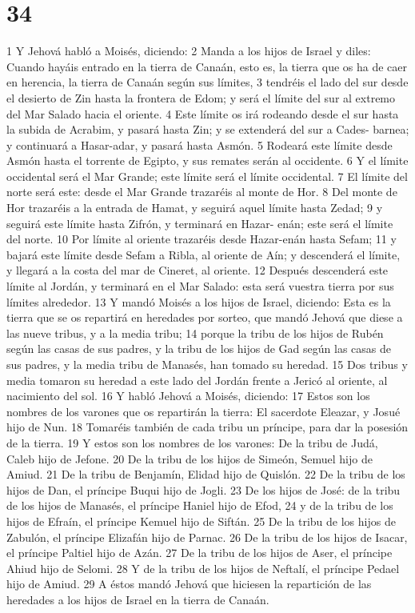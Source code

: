 \chapter{34}


1 Y Jehová habló a Moisés, diciendo:
2 Manda a los hijos de Israel y diles: Cuando hayáis entrado en la tierra de Canaán, esto es, la tierra que os ha de caer en herencia, la tierra de Canaán según sus límites,
3 tendréis el lado del sur desde el desierto de Zin hasta la frontera de Edom; y será el límite del sur al extremo del Mar Salado hacia el oriente.
4 Este límite os irá rodeando desde el sur hasta la subida de Acrabim, y pasará hasta Zin; y se extenderá del sur a Cades- barnea; y continuará a Hasar-adar, y pasará hasta Asmón.
5 Rodeará este límite desde Asmón hasta el torrente de Egipto, y sus remates serán al occidente.
6 Y el límite occidental será el Mar Grande; este límite será el límite occidental. 
7 El límite del norte será este: desde el Mar Grande trazaréis al monte de Hor.
8 Del monte de Hor trazaréis a la entrada de Hamat, y seguirá aquel límite hasta Zedad;
9 y seguirá este límite hasta Zifrón, y terminará en Hazar- enán; este será el límite del norte. 
10 Por límite al oriente trazaréis desde Hazar-enán hasta Sefam;
11 y bajará este límite desde Sefam a Ribla, al oriente de Aín; y descenderá el límite, y llegará a la costa del mar de Cineret, al oriente.
12 Después descenderá este límite al Jordán, y terminará en el Mar Salado: esta será vuestra tierra por sus límites alrededor.
13 Y mandó Moisés a los hijos de Israel, diciendo: Esta es la tierra que se os repartirá en heredades por sorteo, que mandó Jehová que diese a las nueve tribus, y a la media tribu;
14 porque la tribu de los hijos de Rubén según las casas de sus padres, y la tribu de los hijos de Gad según las casas de sus padres, y la media tribu de Manasés, han tomado su heredad.
15 Dos tribus y media tomaron su heredad a este lado del Jordán frente a Jericó al oriente, al nacimiento del sol.
16 Y habló Jehová a Moisés, diciendo:
17 Estos son los nombres de los varones que os repartirán la tierra: El sacerdote Eleazar, y Josué hijo de Nun.
18 Tomaréis también de cada tribu un príncipe, para dar la posesión de la tierra.
19 Y estos son los nombres de los varones: De la tribu de Judá, Caleb hijo de Jefone.
20 De la tribu de los hijos de Simeón, Semuel hijo de Amiud.
21 De la tribu de Benjamín, Elidad hijo de Quislón.
22 De la tribu de los hijos de Dan, el príncipe Buqui hijo de Jogli.
23 De los hijos de José: de la tribu de los hijos de Manasés, el príncipe Haniel hijo de Efod,
24 y de la tribu de los hijos de Efraín, el príncipe Kemuel hijo de Siftán.
25 De la tribu de los hijos de Zabulón, el príncipe Elizafán hijo de Parnac.
26 De la tribu de los hijos de Isacar, el príncipe Paltiel hijo de Azán.
27 De la tribu de los hijos de Aser, el príncipe Ahiud hijo de Selomi.
28 Y de la tribu de los hijos de Neftalí, el príncipe Pedael hijo de Amiud. 
29 A éstos mandó Jehová que hiciesen la repartición de las heredades a los hijos de Israel en la tierra de Canaán.

